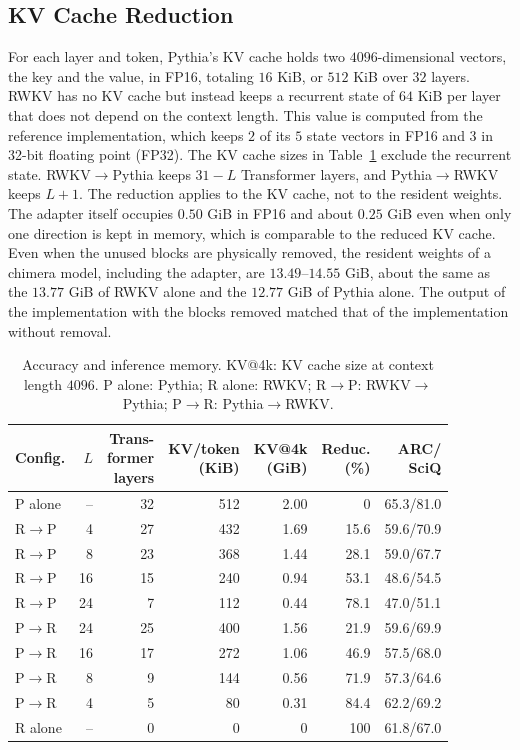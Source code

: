 \documentclass[conference]{IEEEtran}
\newcommand{\tabref}[1]{Table~\ref{#1}}
\newcommand{\RtoP}{RWKV$\to$\allowbreak Pythia}
\newcommand{\PtoR}{Pythia$\to$\allowbreak RWKV}
\begin{document}
\subsection{KV Cache Reduction}\label{sec:kv}
For each layer and token, Pythia's KV cache holds two $4096$-dimensional vectors, the key and the value, in FP16, totaling $16$ KiB,
or $512$ KiB over $32$ layers.
RWKV has no KV cache but instead keeps a recurrent state of $64$ KiB per layer that does not depend on the context length. This value
is computed from the reference implementation, which keeps $2$ of its $5$ state vectors in FP16 and $3$ in 32-bit floating point (FP32). The KV cache sizes in
\tabref{tab:kv} exclude the recurrent state.
\RtoP{} keeps $31{-}L$ Transformer layers, and \PtoR{} keeps $L{+}1$. The reduction applies to the KV cache, not to the resident weights.
The adapter itself occupies $0.50$ GiB in FP16 and about $0.25$ GiB even when only one direction is kept in memory, which is comparable
to the reduced KV cache.
Even when the unused blocks are physically removed, the resident weights of a chimera model, including the adapter, are $13.49$--$14.55$ GiB, about the same as the $13.77$ GiB of RWKV
alone and the $12.77$ GiB of Pythia alone. The output of the implementation with the blocks removed matched that of the implementation without removal.

\begin{table}[!t]\centering\small
\caption{Accuracy and inference memory. KV@4k: KV cache size at context length $4096$. P alone: Pythia; R alone: RWKV; R$\to$P: RWKV$\to$Pythia; P$\to$R: Pythia$\to$RWKV.}\label{tab:kv}
\setlength{\tabcolsep}{2.4pt}
\begin{tabular}{lrrrrrr}\toprule
Config. & $L$ & \shortstack{Trans-\\former\\layers} & \shortstack{KV/token\\(KiB)} & \shortstack{KV@4k\\(GiB)} & \shortstack{Reduc.\\(\%)} & \shortstack{ARC/\\SciQ}\\\midrule
P alone & -- & 32 & 512 & 2.00 & 0 & 65.3/81.0\\
R$\to$P & 4  & 27 & 432 & 1.69 & 15.6 & 59.6/70.9\\
R$\to$P & 8  & 23 & 368 & 1.44 & 28.1 & 59.0/67.7\\
R$\to$P & 16 & 15 & 240 & 0.94 & 53.1 & 48.6/54.5\\
R$\to$P & 24 &  7 & 112 & 0.44 & 78.1 & 47.0/51.1\\
P$\to$R & 24 & 25 & 400 & 1.56 & 21.9 & 59.6/69.9\\
P$\to$R & 16 & 17 & 272 & 1.06 & 46.9 & 57.5/68.0\\
P$\to$R & 8  &  9 & 144 & 0.56 & 71.9 & 57.3/64.6\\
P$\to$R & 4 & 5 & 80 & 0.31 & 84.4 & 62.2/69.2\\
R alone & -- & 0 & 0 & 0 & 100 & 61.8/67.0\\\bottomrule
\end{tabular}
\end{table}
\end{document}
